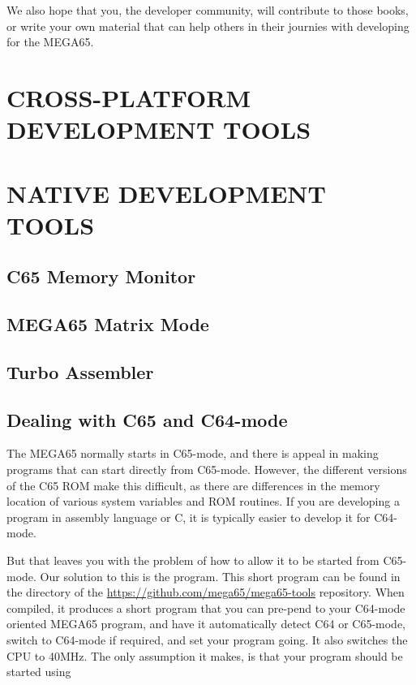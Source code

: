 We also hope that you, the developer community, will contribute to
those books, or write your own material that can help others in their
journies with developing for the MEGA65.

\part{CROSS-PLATFORM DEVELOPMENT TOOLS}








\part{NATIVE DEVELOPMENT TOOLS}

\chapter{C65 Memory Monitor}

\chapter{MEGA65 Matrix Mode}

\chapter{Turbo Assembler}

\chapter{Dealing with C65 and C64-mode}

The MEGA65 normally starts in C65-mode, and there is appeal in making
programs that can start directly from C65-mode.  However, the
different versions of the C65 ROM make this difficult, as there are
differences in the memory location of various system variables and ROM
routines.  If you are developing a program in assembly language or
C, it is typically easier to develop it for C64-mode.

But that leaves
you with the problem of how to allow it to be started from C65-mode.
Our solution to this is the  program.  This
short program can be found in the  directory of
the \url{https://github.com/mega65/mega65-tools} repository.  When
compiled, it produces a short program that you can pre-pend to your
C64-mode oriented MEGA65 program, and have it automatically detect
C64 or C65-mode, switch to C64-mode if required, and set your
program going. It also switches the CPU to 40MHz.  The only
assumption it makes, is that your program should be started using

